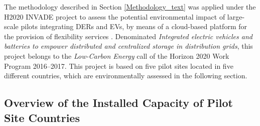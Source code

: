 {The methodology described in Section \ref{Methodology_text} was applied under the H2020 INVADE project to assess the potential environmental impact of large-scale pilots integrating DERs and EVs, by means of a cloud-based platform for {the provision of flexibility services}%
. Denominated \textit{Integrated electric vehicles and batteries to empower distributed and centralized storage in distribution grids}, this project belongs to the  \textit{Low-Carbon Energy} call of the Horizon 2020 Work Program 2016--2017. This project is based on five pilot sites located in five different countries, which are  environmentally assessed in the following section.  %

\subsection{Overview of the Installed Capacity of Pilot Site Countries} 

}
